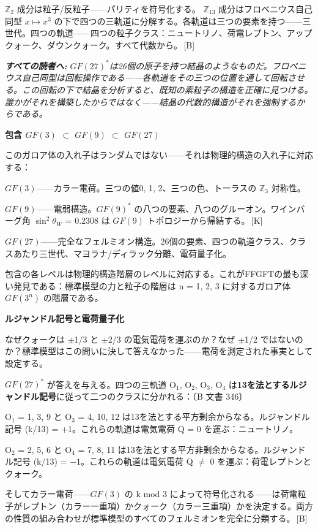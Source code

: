 \documentclass[11pt,openany]{book}
\newcommand{\status}[1]{\penalty10000\,{\tiny\textcolor{gray!70}{[#1]}}}
\newenvironment{laierspur}{%
  \par\vspace{4pt}%
  \noindent\small\itshape\color{blue!60!black}%
  \textbf{すべての読者へ:}\enspace\ignorespaces}{%
  \par\vspace{4pt}\normalsize\normalfont\normalcolor}
\begin{document}
$\mathbb{Z}_2$ 成分は粒子/反粒子——パリティを符号化する。
$\mathbb{Z}_{13}$ 成分はフロベニウス自己同型 $x \mapsto x^3$ の下で四つの三軌道に分解する。各軌道は三つの要素を持つ——三世代。四つの軌道——四つの粒子クラス：ニュートリノ、荷電レプトン、アップクォーク、ダウンクォーク。すべて代数から。\status{B}

\begin{laierspur}
$GF(27)^*$は26個の原子を持つ結晶のようなものだ。フロベニウス自己同型は回転操作である——各軌道をその三つの位置を通して回転させる。この回転の下で結晶を分析すると、既知の素粒子の構造を正確に見つける。誰かがそれを構築したからではなく——結晶の代数的構造がそれを強制するからである。
\end{laierspur}

\textbf{包含 $GF(3)$ $\subset$ $GF(9)$ $\subset$ $GF(27)$}

このガロア体の入れ子はランダムではない——それは物理的構造の入れ子に対応する：

$GF(3)$——カラー電荷。三つの値{0, 1, 2}、三つの色、トーラスの $\mathbb{Z}_3$ 対称性。

$GF(9)$——電弱構造。$GF(9)^*$ の八つの要素、八つのグルーオン。ワインバーグ角 $\sin^2\theta_W$ = 0.2308 は $GF(9)$ トポロジーから帰結する。\status{K}

$GF(27)$——完全なフェルミオン構造。26個の要素、四つの軌道クラス、クラスあたり三世代、マヨラナ/ディラック分離、電荷量子化。

包含の各レベルは物理的構造階層のレベルに対応する。これがFFGFTの最も深い発見である：標準模型の力と粒子の階層は n = 1, 2, 3 に対するガロア体 $GF(3^n)$ の階層である。

\textbf{ルジャンドル記号と電荷量子化}

なぜクォークは $\pm$1/3 と $\pm$2/3 の電気電荷を運ぶのか？なぜ $\pm$1/2 ではないのか？標準模型はこの問いに決して答えなかった——電荷を測定された事実として設定する。

$GF(27)^*$ が答えを与える。四つの三軌道 O$_1$, O$_2$, O$_3$, O$_4$ は\textbf{13を法とするルジャンドル記号}に従って二つのクラスに分かれる：〔B 文書 346〕

O$_1$ = {1, 3, 9} と O$_3$ = {4, 10, 12} は13を法とする平方剰余からなる。ルジャンドル記号 (k/13) = +1。これらの軌道は電気電荷 Q = 0 を運ぶ：ニュートリノ。

O$_2$ = {2, 5, 6} と O$_4$ = {7, 8, 11} は13を法とする平方非剰余からなる。ルジャンドル記号 (k/13) = $-1$。これらの軌道は電気電荷 Q $\neq$ 0 を運ぶ：荷電レプトンとクォーク。

そしてカラー電荷——$GF(3)$ の k mod 3 によって符号化される——は荷電粒子がレプトン（カラー一重項）かクォーク（カラー三重項）かを決定する。両方の性質の組み合わせが標準模型のすべてのフェルミオンを完全に分類する。\status{B}
\end{document}
